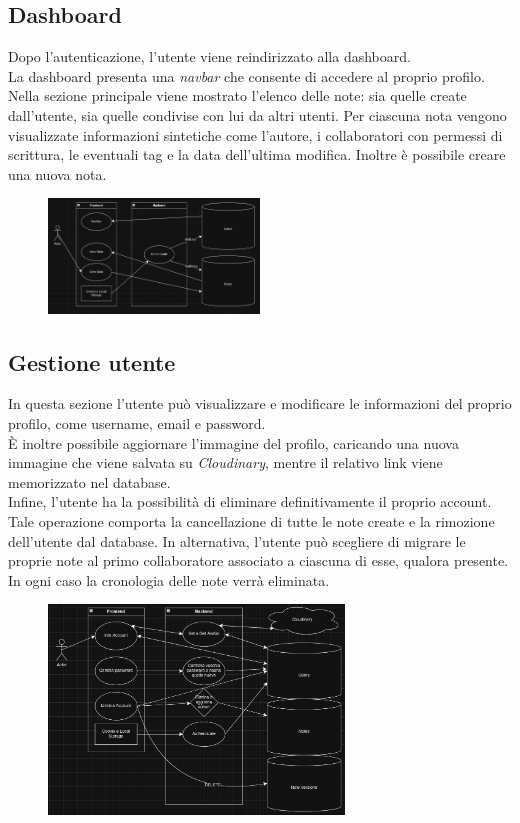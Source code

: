 \documentclass[11pt]{article}
\begin{document}
\subsection{Dashboard}
Dopo l’autenticazione, l’utente viene reindirizzato alla dashboard. \\
La dashboard presenta una \textit{navbar} che consente di accedere al proprio profilo. \\
Nella sezione principale viene mostrato l’elenco delle note: sia quelle create dall’utente, sia quelle condivise con lui da altri utenti. Per ciascuna nota vengono visualizzate informazioni sintetiche come l’autore, i collaboratori con permessi di scrittura, le eventuali tag e la data dell’ultima modifica. Inoltre è possibile creare una nuova nota. \\
\begin{figure}[H]
    \centering
    \includegraphics[width=0.5\textwidth]{./Resources/Diagrams/UML-Dashboard.png}
\end{figure}
\subsection{Gestione utente}
In questa sezione l’utente può visualizzare e modificare le informazioni del proprio profilo, come username, email e password. \\
È inoltre possibile aggiornare l’immagine del profilo, caricando una nuova immagine che viene salvata su \textit{Cloudinary}, mentre il relativo link viene memorizzato nel database. \\
Infine, l’utente ha la possibilità di eliminare definitivamente il proprio account. Tale operazione comporta la cancellazione di tutte le note create e la rimozione dell’utente dal database. In alternativa, l’utente può scegliere di migrare le proprie note al primo collaboratore associato a ciascuna di esse, qualora presente. In ogni caso la cronologia delle note verrà eliminata.
\begin{figure}[H]
    \centering
    \includegraphics[width=0.7\textwidth]{./Resources/Diagrams/UML-Account.png}
\end{figure}
\end{document}
